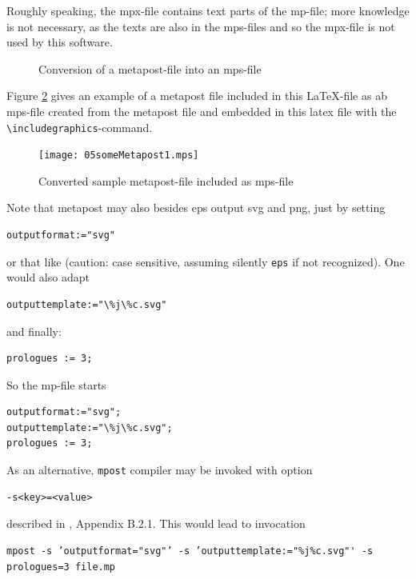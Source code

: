\documentclass[12pt]{article}
\begin{document}
Roughly speaking, the mpx-file contains text parts of the mp-file; 
more knowledge is not necessary, as the texts are also in the mps-files 
and so the mpx-file is not used by this software. 

\begin{figure}[htb]
\begin{center}

\end{center}
\caption{\label{fig:mp2mps}Conversion of a metapost-file into an mps-file}
\end{figure}


Figure \ref{fig:metapost} gives an example of a metapost file 
included in this LaTeX-file as ab mps-file 
created from the metapost file 
and embedded in this latex file 
with the {\tt\textbackslash includegraphics}-command. 

\begin{figure}[htb]
\begin{center}
\texttt{[image: 05someMetapost1.mps]}
\end{center}
\caption{\label{fig:metapost}
Converted sample metapost-file included as mps-file  }
\end{figure}

Note that metapost may also besides \gls{eps} output \gls{svg} and \gls{png}, 
just by setting 
%
\begin{verbatim}
outputformat:="svg" 
\end{verbatim}
%
or that like 
(caution: case sensitive, assuming silently {\tt eps} if not recognized). 
One would also adapt 
%
\begin{verbatim}
outputtemplate:="\%j\%c.svg"
\end{verbatim}
%
and finally: 
%
\begin{verbatim}
prologues := 3;
\end{verbatim}

So the mp-file starts 
%
\lstset{language=metapost, basicstyle=\normalsize}
\begin{lstlisting}
outputformat:="svg";
outputtemplate:="\%j\%c.svg";
prologues := 3;
\end{lstlisting}

As an alternative, {\tt mpost} compiler may be invoked with option 
%
\begin{verbatim}
-s<key>=<value>
\end{verbatim}
%
described in \cite{MPost}, Appendix B.2.1. 
This would lead to invocation 
%
\begin{Verbatim}[fontsize=\scriptsize]
mpost -s ’outputformat="svg"’ -s ’outputtemplate:="%j%c.svg"' -s prologues=3 file.mp
\end{Verbatim}
\end{document}
